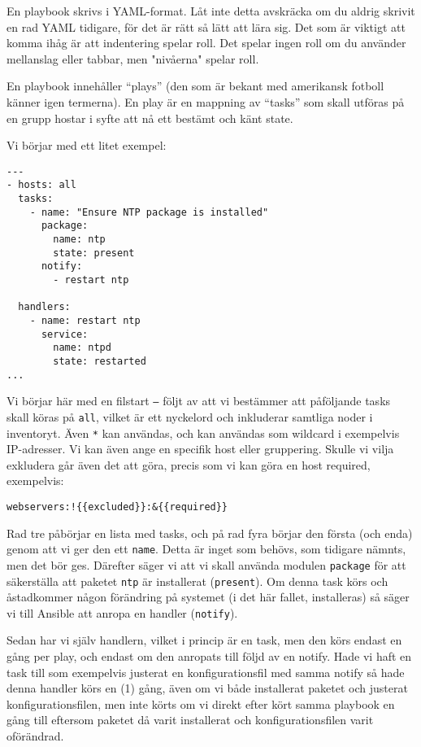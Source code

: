 En playbook skrivs i YAML-format. Låt inte detta avskräcka om du aldrig skrivit en rad YAML tidigare, för det är
rätt så lätt att lära sig. Det som är viktigt att komma ihåg är att indentering spelar roll. Det spelar ingen roll 
om du använder mellanslag eller tabbar, men "nivåerna" spelar roll.

En playbook innehåller ``plays'' (den som är bekant med amerikansk fotboll känner igen termerna). 
En play är en mappning av ``tasks'' som skall utföras på en grupp hostar i syfte att nå ett bestämt och känt state.

Vi börjar med ett litet exempel:

\begin{verbatim}
---
- hosts: all
  tasks:
    - name: "Ensure NTP package is installed"
      package:
        name: ntp
        state: present
      notify:
        - restart ntp

  handlers:
    - name: restart ntp
      service:
        name: ntpd
        state: restarted
...
\end{verbatim}

Vi börjar här med en filstart \texttt{---} följt av att vi bestämmer att påföljande tasks skall köras på \texttt{all}, vilket är ett nyckelord och inkluderar samtliga noder i inventoryt. Även \texttt{*} kan användas, och kan användas som wildcard i exempelvis IP-adresser. Vi kan även ange en specifik host eller gruppering. Skulle vi vilja exkludera går även det att göra, precis som vi kan göra en host required, exempelvis:

\verb+webservers:!{{excluded}}:&{{required}}+

Rad tre påbörjar en lista med tasks, och på rad fyra börjar den första (och enda) genom att vi ger den ett \texttt{name}.
Detta är inget som behövs, som tidigare nämnts, men det bör ges. Därefter säger vi att vi skall använda modulen 
\texttt{package} för att säkerställa att paketet \texttt{ntp} är installerat (\texttt{present}). Om denna task körs
och åstadkommer någon förändring på systemet (i det här fallet, installeras) så säger vi till Ansible att anropa en
handler (\texttt{notify}).

Sedan har vi själv handlern, vilket i princip är en task, men den körs endast en gång per play, och endast om den 
anropats till följd av en notify. Hade vi haft en task till som exempelvis justerat en konfigurationsfil med samma notify så hade denna handler körs en (1) gång, även om vi både installerat paketet och justerat konfigurationsfilen, men inte körts om vi direkt efter kört samma playbook en gång till eftersom paketet då varit installerat och konfigurationsfilen varit oförändrad.

